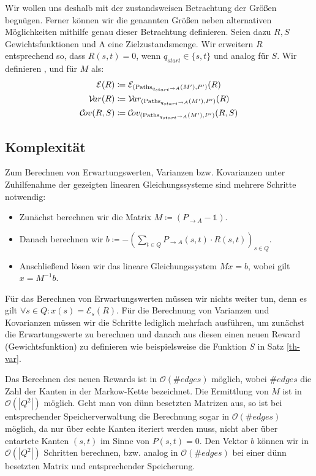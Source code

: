 \documentclass[a4paper]{article}
\newcommand{\mc}{Markow-Kette}
\theoremstyle{nonumberplain}
\begin{document}
Wir wollen uns deshalb mit der zustandsweisen Betrachtung der Größen begnügen. Ferner können wir die genannten Größen neben alternativen Mög\-lich\-keit\-en mithilfe genau dieser Betrachtung definieren. Seien dazu $R, S$ Gewichtsfunktionen und A eine Zielzustandsmenge. Wir erweitern $R$ entsprechend so, dass $R(s,t) = 0$, wenn $q_{start} \in \{s,t\}$ und analog für $S$. Wir definieren \expect{}, \var{} und \cov{} für $M$ als:
\begin{align*}
\mathcal{E}(R) \coloneqq \;& \mathcal{E}_{(\mathrm{Paths}_{q_{start} \rightarrow A}(M'), P')}(R) \\
\mathcal{V}\!ar(R) \coloneqq \;& \mathcal{V}\!ar_{(\mathrm{Paths}_{q_{start} \rightarrow A}(M'), P')}(R) \\
\mathcal{C}\!ov(R,S) \coloneqq \;& \mathcal{C}\!ov_{(\mathrm{Paths}_{q_{start} \rightarrow A}(M'), P')}(R,S) \\
\end{align*}
	
\subsection{Komplexität}

Zum Berechnen von Erwartungswerten, Varianzen bzw. Kovarianzen unter Zuhilfenahme der gezeigten linearen Gleichungssysteme sind mehrere Schritte notwendig:

\begin{itemize}
	\item Zunächst berechnen wir die Matrix $M \coloneqq (P_{\rightarrow A} - \mathbb{1})$.
	\item Danach berechnen wir $b \coloneqq - \left(\sum_{t \in Q}{ P_{\rightarrow A}(s,t) \cdot R(s,t) }\right)_{s \in Q}$.
	\item Anschließend lösen wir das lineare Gleichungssystem $Mx = b$, wobei gilt $x = M^{-1}b$.
\end{itemize}

Für das Berechnen von Erwartungswerten müssen wir nichts weiter tun, denn es gilt $\forall s\in Q : x(s) = \mathcal{E}_s(R)$.
Für die Berechnung von Varianzen und Kovarianzen müssen wir die Schritte lediglich mehrfach ausführen, um zunächst die Erwartungswerte zu berechnen und danach aus diesen einen neuen Reward (Gewichtsfunktion) zu definieren wie beispielsweise die Funktion $S$ in Satz \ref{th-var}.

Das Berechnen des neuen Rewards ist in $\mathcal{O}(\#edges)$ möglich, wobei $\#edges$ die Zahl der Kanten in der \mc{} bezeichnet. Die Ermittlung von $M$ ist in $\mathcal{O}(|Q^2|)$ möglich. Geht man von dünn besetzten Matrizen aus, so ist bei entsprechender Speicherverwaltung die Berechnung sogar in $\mathcal{O}(\#edges)$ möglich, da nur über echte Kanten iteriert werden muss, nicht aber über entartete Kanten $(s,t)$ im Sinne von $P(s,t) = 0$. Den Vektor $b$ können wir in $\mathcal{O}(|Q^2|)$ Schritten berechnen, bzw. analog in $\mathcal{O}(\#edges)$ bei einer dünn besetzten Matrix und entsprechender Speicherung.
\end{document}
